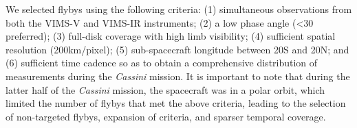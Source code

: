 \documentclass[tighten,linenumbers,twocolumn]{aastex631}
\begin{document}
We selected flybys using the following criteria: (1) simultaneous observations from both the VIMS-V and VIMS-IR instruments; (2) a low phase angle (<30\textdegree{} preferred); (3) full-disk coverage with high limb visibility; (4) sufficient spatial resolution (200km/pixel); (5) sub-spacecraft longitude between 20\textdegree{}S and 20\textdegree{}N; and (6) sufficient time cadence so as to obtain a comprehensive distribution of measurements during the \textit{Cassini} mission. It is important to note that during the latter half of the \textit{Cassini} mission, the spacecraft was in a polar orbit, which limited the number of flybys that met the above criteria, leading to the selection of non-targeted flybys, expansion of criteria, and sparser temporal coverage.

\end{document}
